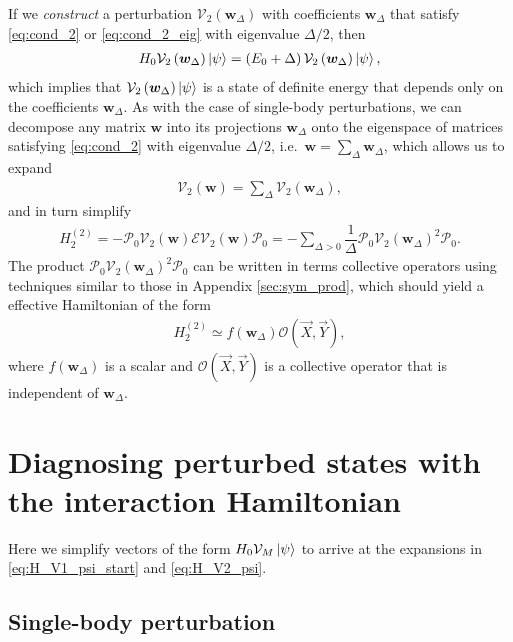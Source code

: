 \documentclass[nofootinbib,notitlepage,11pt]{revtex4-2}
\newcommand{\f}[2]{\dfrac{#1}{#2}} %
\newcommand{\p}[1]{\left(#1\right)} %
\newcommand{\m}{\bm} %
\renewcommand{\v}{\vec} %
\newcommand{\1}{\mathds{1}}
\newcommand{\E}{\mathcal{E}}
\renewcommand{\O}{\mathcal{O}}
\renewcommand{\P}{\mathcal{P}}
\newcommand{\V}{\mathcal{V}}
\begin{document}
If we {\it construct} a perturbation $\V_2\p{\m w_\Delta}$ with
coefficients $\m w_\Delta$ that satisfy \eqref{eq:cond_2} or
\eqref{eq:cond_2_eig} with eigenvalue $\Delta/2$, then
\begin{align}
  H_0 \V_2\p{\m w_\Delta} \ket\psi
  = \p{E_0 + \Delta} \V_2\p{\m w_\Delta} \ket\psi,
  \label{eq:H_V1_psi}
\end{align}
which implies that $\V_2\p{\m w_\Delta}\ket\psi$ is a state of
definite energy that depends only on the coefficients $\m w_\Delta$.
As with the case of single-body perturbations, we can decompose any
matrix $\m w$ into its projections $\m w_\Delta$ onto the eigenspace
of matrices satisfying \eqref{eq:cond_2} with eigenvalue $\Delta/2$,
i.e.~$\m w=\sum_\Delta\m w_\Delta$, which allows us to expand
\begin{align}
  \V_2\p{\m w} = \sum_\Delta \V_2\p{\m w_\Delta},
\end{align}
and in turn simplify
\begin{align}
  H_2^{(2)} = - \P_0 \V_2\p{\m w} \E \V_2\p{\m w} \P_0
  = -\sum_{\Delta>0} \f1\Delta \P_0 \V_2\p{\m w_\Delta}^2 \P_0.
\end{align}
The product $\P_0 \V_2\p{\m w_\Delta}^2 \P_0$ can be written in terms
collective operators using techniques similar to those in Appendix
\ref{sec:sym_prod}, which should yield a effective Hamiltonian of the
form
\begin{align}
  H_2^{(2)} \simeq f\p{\m w_\Delta} \O\p{\v X,\v Y},
\end{align}
where $f\p{\m w_\Delta}$ is a scalar and $\O\p{\v X,\v Y}$ is a
collective operator that is independent of $\m w_\Delta$.

\appendix

\section{Diagnosing perturbed states with the interaction Hamiltonian}

Here we simplify vectors of the form $H_0\V_M\ket\psi$ to arrive at
the expansions in \eqref{eq:H_V1_psi_start} and \eqref{eq:H_V2_psi}.

\subsection{Single-body perturbation}
\label{sec:H_V1_psi}
\end{document}
